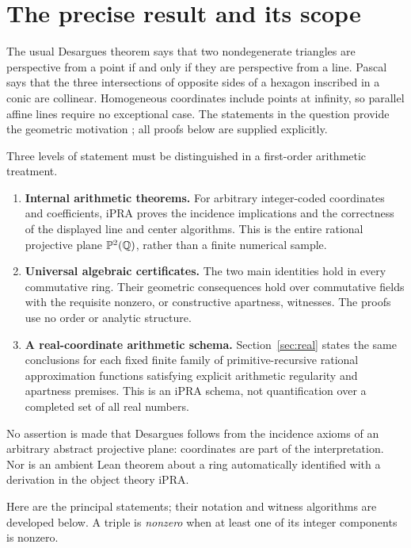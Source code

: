 \section{The precise result and its scope}

The usual Desargues theorem says that two nondegenerate triangles are
perspective from a point if and only if they are perspective from a line.
Pascal says that the three intersections of opposite sides of a hexagon
inscribed in a conic are collinear. Homogeneous coordinates include points
at infinity, so parallel affine lines require no exceptional case.
The statements in the question provide the geometric motivation
\cite{desargues,pascal}; all proofs below are supplied explicitly.

Three levels of statement must be distinguished in a first-order arithmetic
treatment.
\begin{enumerate}
\item \textbf{Internal arithmetic theorems.} For arbitrary integer-coded
coordinates and coefficients, iPRA proves the incidence implications and
the correctness of the displayed line and center algorithms. This is
the entire rational projective plane $\mathbb P^2(\mathbb Q)$, rather than a
finite numerical sample.
\item \textbf{Universal algebraic certificates.} The two main identities
hold in every commutative ring. Their geometric consequences hold over
commutative fields with the requisite nonzero, or constructive apartness,
witnesses. The proofs use no order or analytic structure.
\item \textbf{A real-coordinate arithmetic schema.}
Section~\ref{sec:real} states the same conclusions for each fixed finite
family of primitive-recursive rational approximation functions satisfying
explicit arithmetic regularity and apartness premises. This is an iPRA
schema, not quantification over a completed set of all real numbers.
\end{enumerate}
No assertion is made that Desargues follows from the incidence axioms of
an arbitrary abstract projective plane: coordinates are part of the
interpretation. Nor is an ambient Lean theorem about a ring automatically
identified with a derivation in the object theory iPRA.

Here are the principal statements; their notation and witness algorithms
are developed below. A triple is \emph{nonzero} when at least one of its
integer components is nonzero.

